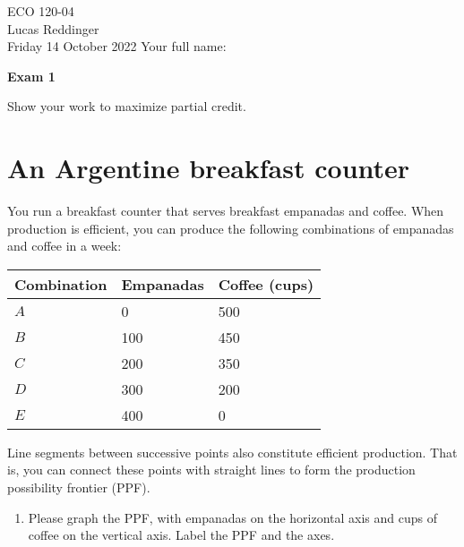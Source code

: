 \documentclass[
    letterpaper,paper=portrait,fleqn,
    DIV=16,fontsize=12pt,twoside=semi,
    parskip=full-,
    headings=standardclasses]
{scrartcl}
\begin{document}
\RaggedRight
\thispagestyle{plain}

ECO 120-04 \\
Lucas Reddinger \\
Friday 14 October 2022 \hfill Your full name: \underline{\hspace{3.25in}}

\vspace{0.7\baselineskip}
\textbf{\LARGE Exam 1}
\vspace{0.3\baselineskip}

Show your work to maximize partial credit.

\clearpage

\section{An Argentine breakfast counter}

You run a breakfast counter that serves breakfast empanadas and coffee. When production is efficient, you can produce the following combinations of empanadas and coffee in a week:

\begin{tabular}{lll}
\toprule
Combination & Empanadas & Coffee (cups) \\
\midrule
$A$ & 0 & 500 \\
$B$ & 100 & 450 \\
$C$ & 200 & 350 \\
$D$ & 300 & 200 \\
$E$ & 400 & 0 \\
\bottomrule
\end{tabular}

Line segments between successive points also constitute efficient production. That is, you can connect these points with straight lines to form the production possibility frontier (PPF).

\begin{enumerate}

\item Please graph the PPF, with empanadas on the horizontal axis and cups of coffee on the vertical axis. Label the PPF and the axes.

\end{enumerate}

\begin{center}
\vspace{18pt}
\end{center}
\end{document}
